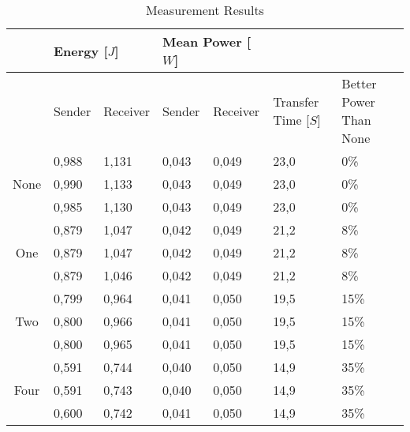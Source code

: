 \begin{table}[h]
	\begin{tabular}{cllllll}

	\cline{2-5} 
	\multicolumn{1}{l}{} 	& \multicolumn{2}{l}{Energy {[$J$]}} & \multicolumn{2}{l}{Mean Power [$W$]} &	&	\\ \hline
	\rowcolor{gr}
	\multicolumn{1}{l}{Bit Removed}	& Sender	& Receiver	& Sender	& Receiver	& \multicolumn{1}{l}{Transfer Time [$S$]} & \multicolumn{1}{l}{Better Power Than None} \\ \hline
	\multicolumn{1}{c}{\multirow{3}{*}{None}} & 0,988	& 1,131	& 0,043	& 0,049	& \multicolumn{1}{l}{23,0}	& \multicolumn{1}{l}{0\%}	\\  
	\multicolumn{1}{c}{}	& 0,990	& 1,133	& 0,043	& 0,049	& \multicolumn{1}{l}{23,0}	& \multicolumn{1}{l}{0\%}	\\ 
	\multicolumn{1}{c}{}	& 0,985	& 1,130	& 0,043	& 0,049	& \multicolumn{1}{l}{23,0}	& \multicolumn{1}{l}{0\%}	\\ \hline
	\multicolumn{1}{c}{\multirow{3}{*}{One}}  & 0,879	& 1,047	& 0,042	& 0,049	& \multicolumn{1}{l}{21,2}	& \multicolumn{1}{l}{8\%}	\\ %
	\multicolumn{1}{c}{}	& 0,879	& 1,047	& 0,042	& 0,049	& \multicolumn{1}{l}{21,2}	& \multicolumn{1}{l}{8\%}	\\ %
	\multicolumn{1}{c}{}	& 0,879	& 1,046	& 0,042	& 0,049	& \multicolumn{1}{l}{21,2}	& \multicolumn{1}{l}{8\%}	\\ \hline
	\multicolumn{1}{c}{\multirow{3}{*}{Two}}  & 0,799	& 0,964	& 0,041	& 0,050	& \multicolumn{1}{l}{19,5}	& \multicolumn{1}{l}{15\%}	\\ %
	\multicolumn{1}{c}{}	& 0,800	& 0,966	& 0,041	& 0,050	& \multicolumn{1}{l}{19,5}	& \multicolumn{1}{l}{15\%}	\\ %
	\multicolumn{1}{c}{}	& 0,800	& 0,965	& 0,041	& 0,050	& \multicolumn{1}{l}{19,5}	& \multicolumn{1}{l}{15\%}	\\ \hline
	\multicolumn{1}{c}{\multirow{3}{*}{Four}} & 0,591	& 0,744	& 0,040	& 0,050	& \multicolumn{1}{l}{14,9}	& \multicolumn{1}{l}{35\%}	\\ %
	\multicolumn{1}{c}{}	& 0,591 & 0,743	& 0,040	& 0,050	& \multicolumn{1}{l}{14,9}	& \multicolumn{1}{l}{35\%}	\\ %
	\multicolumn{1}{c}{}	& 0,600 & 0,742	& 0,041	& 0,050	& \multicolumn{1}{l}{14,9}	& \multicolumn{1}{l}{35\%}	\\ \hline
	\end{tabular}

	\caption{Measurement Results }
	\label{tab:MeasurementResults}
\end{table}
